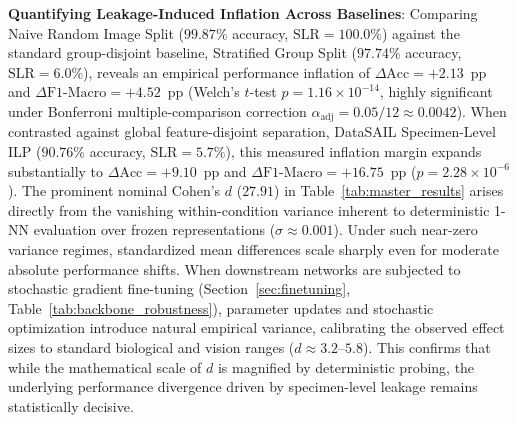 \documentclass[a4paper,fleqn]{cas-sc}
\begin{document}
\textbf{Quantifying Leakage-Induced Inflation Across Baselines}: Comparing \textsf{Naive Random Image Split} ($99.87\%$ accuracy, $\mathrm{SLR}=100.0\%$) against the standard group-disjoint baseline, \textsf{Stratified Group Split} ($97.74\%$ accuracy, $\mathrm{SLR}=6.0\%$), reveals an empirical performance inflation of $\Delta\text{Acc} = +2.13$~pp and $\Delta\text{F1-Macro} = +4.52$~pp (Welch's $t$-test $p = 1.16 \times 10^{-14}$, highly significant under Bonferroni multiple-comparison correction $\alpha_{\text{adj}} = 0.05/12 \approx 0.0042$). When contrasted against global feature-disjoint separation, \textsf{DataSAIL Specimen-Level ILP} ($90.76\%$ accuracy, $\mathrm{SLR}=5.7\%$), this measured inflation margin expands substantially to $\Delta\text{Acc} = +9.10$~pp and $\Delta\text{F1-Macro} = +16.75$~pp ($p = 2.28 \times 10^{-6}$). The prominent nominal Cohen's $d$ ($27.91$) in Table~\ref{tab:master_results} arises directly from the vanishing within-condition variance inherent to deterministic 1-NN evaluation over frozen representations ($\sigma \approx 0.001$). Under such near-zero variance regimes, standardized mean differences scale sharply even for moderate absolute performance shifts. When downstream networks are subjected to stochastic gradient fine-tuning (Section~\ref{sec:finetuning}, Table~\ref{tab:backbone_robustness}), parameter updates and stochastic optimization introduce natural empirical variance, calibrating the observed effect sizes to standard biological and vision ranges ($d \approx 3.2$--$5.8$). This confirms that while the mathematical scale of $d$ is magnified by deterministic probing, the underlying performance divergence driven by specimen-level leakage remains statistically decisive.
\end{document}

